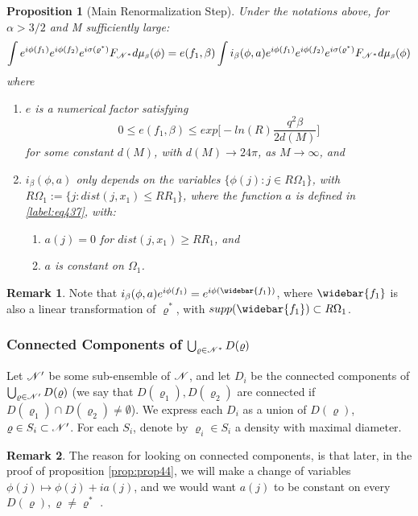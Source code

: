 \documentclass[11pt,reqno]{article}
\newtheorem{prop}[thm]{Proposition}
\theoremstyle{definition}
\newtheorem*{remark}{Remark}
\numberwithin{equation}{section}
\begin{document}
\begin{prop}[Main Renormalization Step] \label{prop:prop44}
Under the notations above, for $\alpha > 3/2$ and M sufficiently large:
\begin{equation} \label{label:eq44}
\int e^{i\phi(f_1)} e^{i\phi(f_2)} e^{i\sigma(\varrho^*)} F_{\mathscr{N}^*}d\mu_{\text{\tiny$\beta$}}(\phi) = 
e(f_1, \beta) \int i_\beta(\phi,a) e^{i\phi(f_1)} e^{i\phi(f_2)} e^{i\sigma(\varrho^*)} F_{\mathscr{N}^*}d\mu_{\text{\tiny$\beta$}}(\phi)
\end{equation}
where
\begin{enumerate}[label={\alph*)}]
\item $e$ is a numerical factor satisfying
$$
0 \leq e(f_1, \beta) \leq exp\Big[ -ln(R)\frac{q^2\beta}{2d(M)} \Big]
$$
for some constant $d(M)$, with $d(M) \rightarrow 24\pi$, as $M\rightarrow \infty$, and
\item $i_\beta(\phi,a)$ only depends on the variables $\{ \phi(j):j \in R\Omega_1 \}$, with $R\Omega_1 := \{ j: dist(j,x_1) \leq RR_1 \}$, where the function $a$ is defined in \eqref{label:eq437}, with:
\begin{enumerate}
\item $a(j)=0$ for $dist(j,x_1) \geq RR_1$, and
\item $a$ is constant on $\Omega_1$.
\end{enumerate}

\end{enumerate}
\end{prop}
\begin{remark}
Note that $i_\beta(\phi,a) e^{i\phi(f_1)} = e^{i\phi(\widebar{f_1})}$, where $\widebar{f_1}$ is also a linear transformation of $\varrho^*$, with $supp(\widebar{f_1}) \subset R\Omega_1$.
\end{remark}
\subsubsection{Connected Components of $\bigcup_{\varrho \in \mathscr{N}^*}D(\varrho)$}
Let $\mathscr{N}^\prime$ be some sub-ensemble of $\mathscr{N}$, and let $D_i$ be the connected components of $\bigcup_{\varrho \in \mathscr{N}^\prime}D(\varrho)$ (we say that $D(\varrho_1), D(\varrho_2)$ are connected if $D(\varrho_1)\cap D(\varrho_2)\neq\emptyset$). We express each $D_i$ as a union of $D(\varrho)$, $\varrho \in S_i \subset \mathscr{N}^\prime$. For each $S_i$, denote by $\varrho_i \in S_i$ a density with maximal diameter.
\begin{remark}
The reason for looking on connected components, is that later, in the proof of proposition \eqref{prop:prop44}, we will make a change of variables $\phi(j) \longmapsto \phi(j) + ia(j)$, and we would want $a(j)$ to be constant on every $D(\varrho), \varrho \neq \varrho^*$ .
\end{remark}
\end{document}
